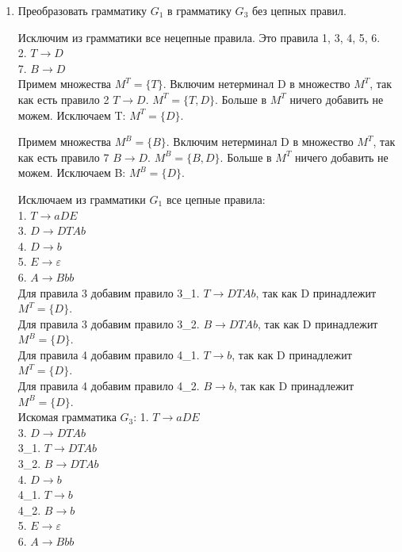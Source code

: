\documentclass[a4paper,14pt]{extarticle}
\begin{document}
\begin{enumerate}[1.]
\item Преобразовать грамматику $G_1$ в грамматику $G_3$ без цепных правил.

Исключим из грамматики все нецепные правила. Это правила 1, 3, 4, 5, 6.\\
2. $T \rightarrow D$\\
7. $B \rightarrow D$\\

Примем множества $M^T = \{T\}$.
Включим нетерминал D в множество $M^T$, так как есть правило 2 $T \rightarrow D$.
$M^T = \{T, D\}$.
Больше в $M^T$ ничего добавить не можем. Исключаем T:
$M^T = \{D\}$.


Примем множества $M^B = \{B\}$.
Включим нетерминал D в множество $M^T$, так как есть правило 7 $B \rightarrow D$.
$M^B = \{B, D\}$.
Больше в $M^T$ ничего добавить не можем. Исключаем B:
$M^B = \{D\}$.


Исключаем из грамматики $G_1$ все цепные правила:\\
1. $T \rightarrow aDE$\\
3. $D \rightarrow DTAb$\\
4. $D \rightarrow b$\\
5. $E \rightarrow \varepsilon$\\
6. $A \rightarrow Bbb$\\

Для правила 3 добавим правило 3\_1. $T \rightarrow DTAb$, так как D принадлежит $M^T = \{D\}$.\\
Для правила 3 добавим правило 3\_2. $B \rightarrow DTAb$, так как D принадлежит $M^B = \{D\}$.\\
Для правила 4 добавим правило 4\_1. $T \rightarrow b$, так как D принадлежит $M^T = \{D\}$.\\
Для правила 4 добавим правило 4\_2. $B \rightarrow b$, так как D принадлежит $M^B = \{D\}$.\\

Искомая грамматика $G_3$:
1. $T \rightarrow aDE$\\
3. $D \rightarrow DTAb$\\
3\_1. $T \rightarrow DTAb$\\
3\_2. $B \rightarrow DTAb$\\
4. $D \rightarrow b$\\
4\_1. $T \rightarrow b$\\
4\_2. $B \rightarrow b$\\
5. $E \rightarrow \varepsilon$\\
6. $A \rightarrow Bbb$\\


\end{enumerate}
\end{document}
